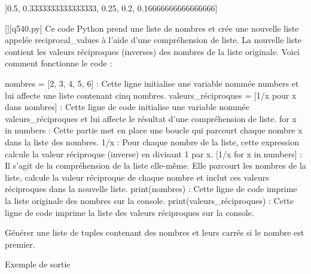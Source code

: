 [0.5, 0.3333333333333333, 0.25, 0.2, 0.16666666666666666]
        \par
        \begin{solution}
            \renewcommand{\nomfichier}{q540.py}
            \pythonfile{\chemincode \nomfichier}[][\nomfichier]
            Ce code Python prend une liste de nombres et crée une nouvelle liste appelée reciprocal_values à l'aide d'une compréhension de liste. La nouvelle liste contient les valeurs réciproques (inverses) des nombres de la liste originale. Voici comment fonctionne le code :

    nombres = [2, 3, 4, 5, 6] : Cette ligne initialise une variable nommée numbers et lui affecte une liste contenant cinq nombres.
    valeurs_réciproques = [1/x pour x dans nombres] : Cette ligne de code initialise une variable nommée valeurs_réciproques et lui affecte le résultat d'une compréhension de liste.
        for x in numbers : Cette partie met en place une boucle qui parcourt chaque nombre x dans la liste des nombres.
        1/x : Pour chaque nombre de la liste, cette expression calcule la valeur réciproque (inverse) en divisant 1 par x.
        [1/x for x in numbers] : Il s'agit de la compréhension de la liste elle-même. Elle parcourt les nombres de la liste, calcule la valeur réciproque de chaque nombre et inclut ces valeurs réciproques dans la nouvelle liste.
    print(nombres) : Cette ligne de code imprime la liste originale des nombres sur la console.
    print(valeurs_réciproques) : Cette ligne de code imprime la liste des valeurs réciproques sur la console.
        \end{solution}
        

        \question
        Générer une liste de tuples contenant des nombres et leurs carrés si le nombre est premier.

Exemple de sortie

